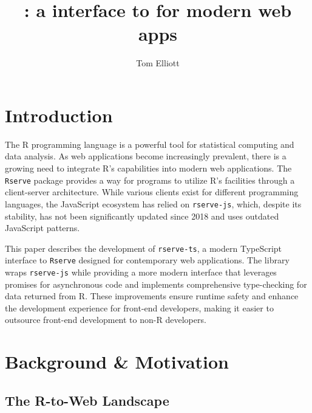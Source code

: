 \documentclass{article}
\title{\pkg{rserve-ts}: a \pkg{TypeScript} interface to \pkg{Rserve} for modern web apps}
\author{Tom Elliott}
\affil{\small iNZight Analytics Ltd\\
Iwi affiliations: Ngāti Whakaue, Ngāti Raukawa}
\date{}
\newcommand{\pkg}[1]{\texttt{#1}}
\newcommand{\prog}[1]{{\sf #1}}
\newcommand{\R}{\prog{R}}
\begin{document}
\maketitle

\begin{abstract}
\end{abstract}

\section{Introduction}
\label{sec:intro}

The \R{} programming language is a powerful tool for statistical computing and data analysis. As web applications become increasingly prevalent, there is a growing need to integrate \R{}'s capabilities into modern web applications. The \pkg{Rserve} package \parencite{Urbanek2003} provides a way for programs to utilize \R{}'s facilities through a client-server architecture. While various clients exist for different programming languages, the JavaScript ecosystem has relied on \pkg{rserve-js}, which, despite its stability, has not been significantly updated since 2018 and uses outdated JavaScript patterns.

This paper describes the development of \pkg{rserve-ts}, a modern TypeScript interface to \pkg{Rserve} designed for contemporary web applications. The library wraps \pkg{rserve-js} while providing a more modern interface that leverages promises for asynchronous code and implements comprehensive type-checking for data returned from \R{}. These improvements ensure runtime safety and enhance the development experience for front-end developers, making it easier to outsource front-end development to non-\R{} developers.


\section{Background \& Motivation}
\label{sec:background}

\subsection{The R-to-Web Landscape}
\label{sec:landscape}
\end{document}
